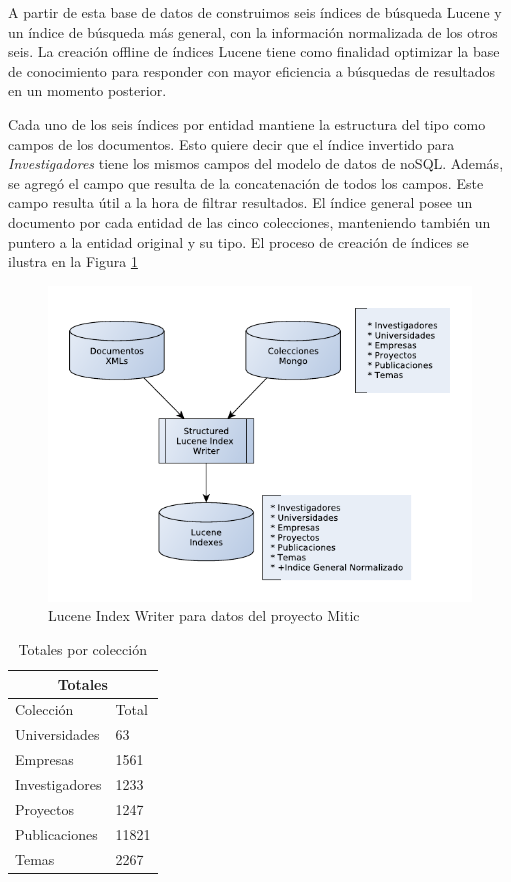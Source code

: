 A partir de esta base de datos de construimos seis índices de búsqueda Lucene y un índice de búsqueda más general, con la información normalizada de los otros seis. La creación offline de índices Lucene tiene como finalidad optimizar la base de conocimiento para responder con mayor eficiencia a búsquedas de resultados en un momento posterior. 

Cada uno de los seis índices por entidad mantiene la estructura del tipo como campos de los documentos. Esto quiere decir que el índice invertido para \emph{Investigadores} tiene los mismos campos
del modelo de datos de noSQL. Además, se agregó el campo  que resulta de la concatenación de todos los campos. Este campo resulta útil a la hora de filtrar resultados. El índice general posee un documento por cada entidad de las cinco colecciones, manteniendo también un puntero a la entidad original y su tipo. El proceso de creación de índices se ilustra en la Figura \ref{fig:LuceneIndexWriterEstructurado}%

 \begin{figure}[H]
   \centering
     \includegraphics{graficos/LuceneIndexWriterEstructurado}
   \caption{Lucene Index Writer para datos del proyecto Mitic}
   \label{fig:LuceneIndexWriterEstructurado}
 \end{figure}

\begin{center}
\begin{table}
\centering
\begin{tabular}{|  l | l |}
\hline
\multicolumn{2}{|c|}{Totales} \\ \hline
Colección & Total \\ \hline
Universidades & 63 \\ \hline 
Empresas & 1561\\ \hline 
Investigadores & 1233\\ \hline 
Proyectos & 1247\\ \hline 
Publicaciones & 11821\\ \hline
Temas & 2267\\ \hline  
\end{tabular}
\caption{Totales por colección}
\label{table:temas}
\end{table}
\end{center}

